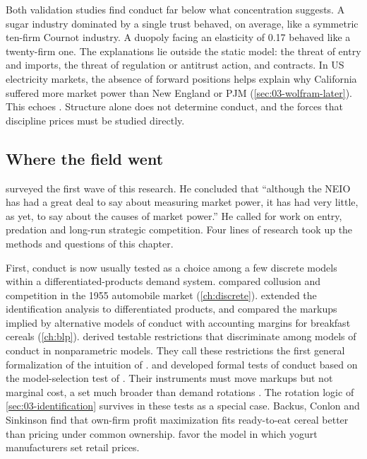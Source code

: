 Both validation studies find conduct far below what concentration suggests. A sugar industry dominated by a single
trust behaved, on average, like a symmetric ten-firm Cournot industry. A duopoly facing an elasticity of 0.17 behaved like a twenty-firm one. The
explanations lie outside the static model: the threat of entry and imports, the threat of regulation or antitrust
action, and contracts. In US electricity markets, the absence of forward positions helps explain why California
suffered more market power than New England or PJM (\cref{sec:03-wolfram-later}). This echoes \citet{Stigler1964}. Structure alone does not determine conduct, and the forces
that discipline prices must be studied directly.

\subsection{Where the field went}\label{sec:03-field}

\citet[pp.~1053--1054]{Bresnahan1989} surveyed the first wave of this research. He concluded that ``although the NEIO
has had a great deal to say about measuring market power, it has had very little, as yet, to say about the causes of
market power.'' He called for work on entry, predation and long-run strategic competition. Four lines of research
took up the methods and questions of this chapter.

First, conduct is now usually tested as a choice among a few discrete models within a differentiated-products demand
system. \citet{Bresnahan1987} compared collusion and competition in the 1955 automobile market (\cref{ch:discrete}).
\citet{Nevo1998} extended the identification analysis to differentiated products, and \citet{Nevo2001} compared the
markups implied by alternative models of conduct with accounting margins for breakfast cereals (\cref{ch:blp}).
\citet[p.~1749]{BerryHaile2014} derived testable restrictions that discriminate among models of conduct in
nonparametric models. They call these restrictions the first general formalization of the intuition of
\citet{Bresnahan1982}. \citet{BackusConlonSinkinson2021} and \citet{DuarteEtAl2024} developed formal tests of conduct
based on the model-selection test of \citet{RiversVuong2002}. Their instruments must move markups but not marginal cost,
a set much broader than demand rotations \citep[p.~4]{BackusConlonSinkinson2021}. The rotation logic of
\cref{sec:03-identification} survives in these tests as a special case. Backus, Conlon and Sinkinson find that own-firm
profit maximization fits ready-to-eat cereal better than pricing under common ownership. \citet[p.~573]{DuarteEtAl2024}
favor the model in which yogurt manufacturers set retail prices.

